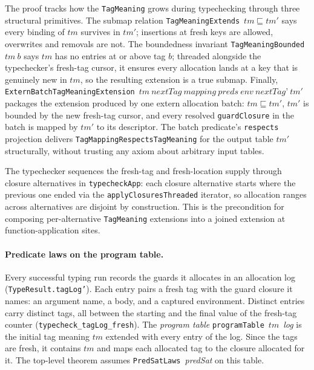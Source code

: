 \documentclass[12pt]{article}
\begin{document}
The proof tracks how the \texttt{TagMeaning} grows during typechecking
through three structural primitives.  The submap relation
\texttt{TagMeaningExtends}~$tm \sqsubseteq tm'$ says every binding of $tm$
survives in $tm'$; insertions at fresh keys are allowed, overwrites and
removals are not.  The boundedness invariant
\texttt{TagMeaningBounded}~$tm~b$ says $tm$ has no entries at or above tag
$b$; threaded alongside the typechecker's fresh-tag cursor, it ensures every
allocation lands at a key that is genuinely new in $tm$, so the resulting
extension is a true submap.  Finally,
\texttt{ExternBatchTagMeaningExtension}~$tm~\textit{nextTag}~\textit{mapping}
~\textit{preds}~\textit{env}~\textit{nextTag'}~tm'$ packages the extension
produced by one extern allocation batch: $tm \sqsubseteq tm'$, $tm'$ is
bounded by the new fresh-tag cursor, and every resolved \texttt{guardClosure}
in the batch is mapped by $tm'$ to its descriptor.  The batch predicate's
\texttt{respects} projection delivers \texttt{TagMappingRespectsTagMeaning}
for the output table $tm'$ structurally, without trusting any axiom about
arbitrary input tables.

The typechecker sequences the fresh-tag and fresh-location supply through
closure alternatives in \texttt{typecheckApp}: each closure alternative starts
where the previous one ended via the \texttt{applyClosuresThreaded} iterator, so
allocation ranges across alternatives are disjoint by construction.  This is
the precondition for composing per-alternative \texttt{TagMeaning} extensions
into a joined extension at function-application sites.

\paragraph{Predicate laws on the program table.}
Every successful typing run records the guards it allocates in an allocation
log (\texttt{TypeResult.tagLog'}).  Each entry pairs a fresh tag with the guard
closure it names: an argument name, a body, and a captured environment.
Distinct entries carry distinct tags, all between the starting and the final
value of the fresh-tag counter (\texttt{typecheck\_tagLog\_fresh}).  The
\emph{program table} \texttt{programTable}~$tm$~\textit{log} is the initial tag
meaning $tm$ extended with every entry of the log.  Since the tags are fresh,
it contains $tm$ and maps each allocated tag to the closure allocated for it.
The top-level theorem assumes \texttt{PredSatLaws}~\textit{predSat} on this
table.
\end{document}
